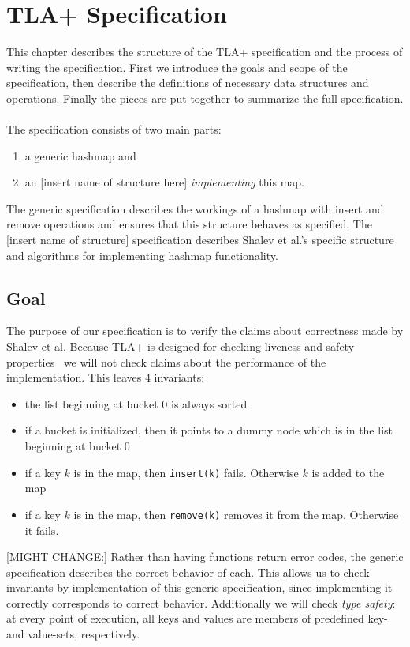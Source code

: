\documentclass{uit-thesis}
\begin{document}
\chapter{TLA+ Specification}\label{ch:specification}
This chapter describes the structure of the TLA+ specification and the process of writing the specification. First we introduce the goals and scope of the specification, then describe the definitions of necessary data structures and operations. Finally the pieces are put together to summarize the full specification.
\\\\
The specification consists of two main parts:
\begin{enumerate}
    \item a generic hashmap and
    \item an [insert name of structure here] \textit{implementing} this map.
\end{enumerate}
The generic specification describes the workings of a hashmap with insert and remove operations and ensures that this structure behaves as specified. The [insert name of structure] specification describes Shalev et al.'s specific structure and algorithms for implementing hashmap functionality.

\section{Goal}\label{sec:spec-goals}
The purpose of our specification is to verify the claims about correctness made by Shalev et al. Because TLA+ is designed for checking liveness and safety properties~\cite{Lund2019} we will not check claims about the performance of the implementation. This leaves 4 invariants:
\begin{itemize}
    \item the list beginning at bucket 0 is always sorted
    \item if a bucket is initialized, then it points to a dummy node which is in the list beginning at bucket 0
    \item if a key $k$ is in the map, then \texttt{insert(k)} fails. Otherwise $k$ is added to the map
    \item if a key $k$ is in the map, then \texttt{remove(k)} removes it from the map. Otherwise it fails.
\end{itemize}
[MIGHT CHANGE:] Rather than having functions return error codes, the generic specification describes the correct behavior of each. This allows us to check invariants by implementation of this generic specification, since implementing it correctly corresponds to correct behavior.
Additionally we will check \textit{type safety}: at every point of execution, all keys and values are members of predefined key- and value-sets, respectively.
\end{document}
